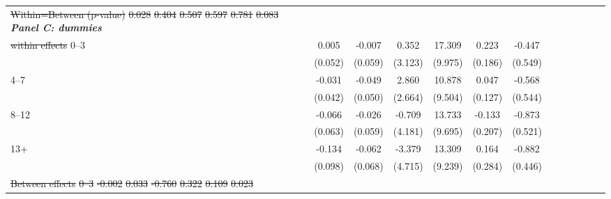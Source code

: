 \documentclass[12pt,english]{article}
\providecommand{\DIFdeltex}[1]{{\protect\color{red}\sout{#1}}}                      %
\providecommand{\DIFdelFL}[1]{\DIFdel{#1}} %
\providecommand{\DIFdelbeginFL}{} %
\providecommand{\DIFdelendFL}{} %
\providecommand{\DIFdel}[1]{\texorpdfstring{\DIFdeltex{#1}}{}} %
\begin{document}
\begin{table}[!ht]
\begin{center}
\begin{adjustbox}{max width=.9\linewidth}
\begin{threeparttable}
{\begin{tabular}{l*{6}{S S}}
\DIFdelFL{Within=Between (p-value)}%
\DIFdelFL{0.028         }%
\DIFdelFL{0.404         }%
\DIFdelFL{0.507         }%
\DIFdelFL{0.597         }%
\DIFdelFL{0.781         }%
\DIFdelFL{0.083         }%
\DIFdelendFL \textit{\textbf{Panel C: dummies}} &&&&&&\\
						\DIFdelbeginFL \DIFdelFL{within effects}%
\DIFdelendFL 0--3&    0.005         &   -0.007         &    0.352         &   17.309\sym{*}  &    0.223         &   -0.447         \\
						&  (0.052)         &  (0.059)         &  (3.123)         &  (9.975)         &  (0.186)         &  (0.549)         \\
						4--7&    -0.031         &   -0.049         &    2.860         &   10.878         &    0.047         &   -0.568         \\
						&  (0.042)         &  (0.050)         &  (2.664)         &  (9.504)         &  (0.127)         &  (0.544)         \\
						8--12&    -0.066         &   -0.026         &   -0.709         &   13.733         &   -0.133         &   -0.873\sym{*}  \\
						&  (0.063)         &  (0.059)         &  (4.181)         &  (9.695)         &  (0.207)         &  (0.521)         \\
						13+&   -0.134         &   -0.062         &   -3.379         &   13.309         &    0.164         &   -0.882\sym{**} \\
						&  (0.098)         &  (0.068)         &  (4.715)         &  (9.239)         &  (0.284)         &  (0.446)         \\
						\DIFdelbeginFL \DIFdelFL{Between effects}%
\DIFdelFL{0--3}%
\DIFdelFL{-0.002         }%
\DIFdelFL{0.033         }%
\DIFdelFL{-0.760         }%
\DIFdelFL{0.322         }%
\DIFdelFL{0.109}%
\DIFdelFL{0.023         }%

\end{tabular}}
\end{threeparttable}
\end{adjustbox}
\end{center}
\end{table}
\end{document}
